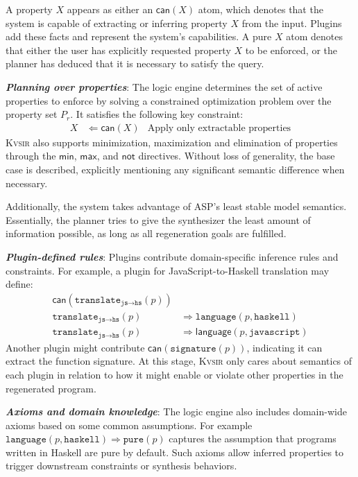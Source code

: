 \documentclass[nonacm,sigplan,review]{acmart}
\newcommand{\sys}{{\scshape Kv{\textalpha}sir}\xspace}
\newcommand{\heading}[1]{\vspace{2pt}\noindent\textbf{\emph{#1}}:\enspace}
\begin{document}
A property $X$ appears as either an
  $\mathsf{can}(X)$ atom, which denotes that the system is capable of extracting or inferring property $X$ from the input.
  Plugins add these facts and represent the system's capabilities.
  A pure $X$ atom denotes that either the user has explicitly requested property $X$ to be enforced, or the planner has deduced that it is necessary to satisfy the query.

\heading{Planning over properties}
The logic engine determines the set of active properties to enforce by solving
a constrained optimization problem over the property set $P_r$.
It satisfies the
following key constraint:
\begin{align*}
  X &\Leftarrow \mathsf{can}(X) &\text{Apply only extractable properties}
\end{align*}
\sys also supports minimization, maximization and elimination of properties
through the $\mathsf{min}$, $\mathsf{max}$, and $\mathsf{not}$ directives.
Without loss of generality, the base case is described, explicitly mentioning any significant semantic difference when necessary.

Additionally, the system takes advantage of ASP's least stable model semantics.
Essentially, the planner tries to give the synthesizer the least amount of information
possible, as long as all regeneration goals are fulfilled.

\heading{Plugin-defined rules}
Plugins contribute domain-specific inference rules and constraints. For example, a plugin for JavaScript-to-Haskell translation may define:
\begin{align*}
\mathsf{can}(\texttt{translate}_{\texttt{js} \rightarrow \texttt{hs}}(p)) & \\
\texttt{translate}_{\texttt{js} \rightarrow \texttt{hs}}(p) &\Rightarrow \texttt{language}(p, \texttt{haskell}) \\
\texttt{translate}_{\texttt{js} \rightarrow \texttt{hs}}(p) &\Rightarrow \mathsf{language}(p, \texttt{javascript})
\end{align*}
Another plugin might contribute $\mathsf{can}(\texttt{signature}(p))$, indicating it can extract the function signature. At this stage, \sys only cares about semantics of each plugin in relation to how it might enable or violate 
other properties in the regenerated program.

\heading{Axioms and domain knowledge}
The logic engine also includes domain-wide axioms based on some common assumptions.
For example
$\texttt{language}(p, \texttt{haskell}) \Rightarrow \texttt{pure}(p)$
captures the assumption that programs written in Haskell are pure by default.
Such axioms allow inferred properties to trigger downstream constraints or synthesis behaviors.
\end{document}
